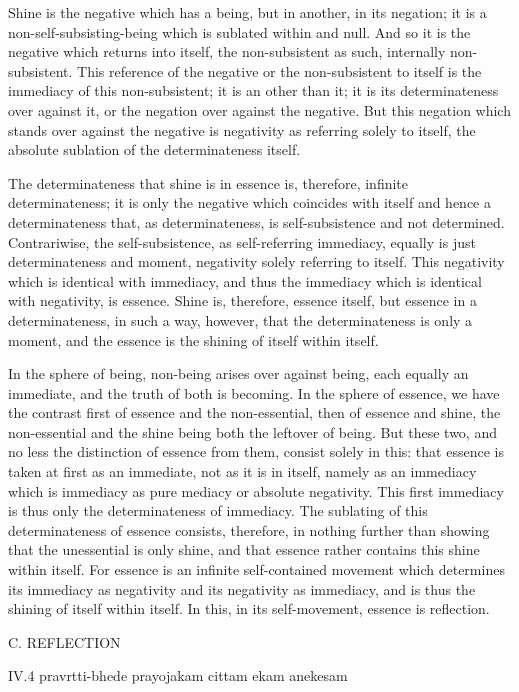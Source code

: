 Shine is the negative which has a being,
but in another, in its negation;
it is a non-self-subsisting-being
which is sublated within and null.
And so it is the negative which returns into itself,
the non-subsistent as such, internally non-subsistent.
This reference of the negative or
the non-subsistent to itself is
the immediacy of this non-subsistent;
it is an other than it;
it is its determinateness over against it,
or the negation over against the negative.
But this negation which stands over against the negative is
negativity as referring solely to itself,
the absolute sublation of the determinateness itself.

The determinateness that shine is in essence is,
therefore, infinite determinateness;
it is only the negative which coincides with itself
and hence a determinateness that, as determinateness,
is self-subsistence and not determined.
Contrariwise, the self-subsistence, as self-referring immediacy,
equally is just determinateness and moment,
negativity solely referring to itself.
This negativity which is identical with immediacy,
and thus the immediacy which is identical with negativity, is essence.
Shine is, therefore, essence itself,
but essence in a determinateness, in such a way, however,
that the determinateness is only a moment,
and the essence is the shining of itself within itself.

In the sphere of being, non-being arises over against being,
each equally an immediate, and the truth of both is becoming.
In the sphere of essence, we have the contrast
first of essence and the non-essential,
then of essence and shine,
the non-essential and the shine being both the leftover of being.
But these two, and no less the distinction of essence from them,
consist solely in this:
that essence is taken at first as an immediate,
not as it is in itself, namely as
an immediacy which is immediacy as pure mediacy or absolute negativity.
This first immediacy is thus only the determinateness of immediacy.
The sublating of this determinateness of essence consists, therefore,
in nothing further than showing that the unessential is only shine,
and that essence rather contains this shine within itself.
For essence is an infinite self-contained movement
which determines its immediacy as negativity
and its negativity as immediacy,
and is thus the shining of itself within itself.
In this, in its self-movement,
essence is reflection.

C. REFLECTION

IV.4
pravrtti-bhede prayojakam cittam ekam anekesam

